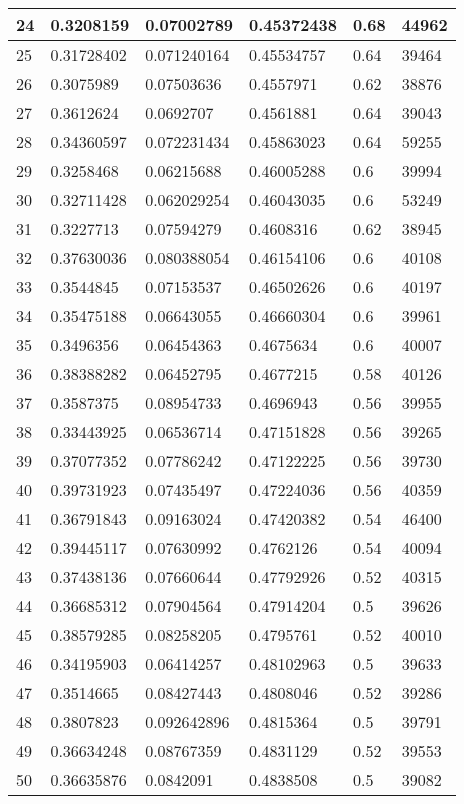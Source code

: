 \begin{longtable}{|l|l|l|l|l|l|}
24 & 0.3208159 & 0.07002789 & 0.45372438 & 0.68 & 44962 \\ \hline 
25 & 0.31728402 & 0.071240164 & 0.45534757 & 0.64 & 39464 \\ \hline 
26 & 0.3075989 & 0.07503636 & 0.4557971 & 0.62 & 38876 \\ \hline 
27 & 0.3612624 & 0.0692707 & 0.4561881 & 0.64 & 39043 \\ \hline 
28 & 0.34360597 & 0.072231434 & 0.45863023 & 0.64 & 59255 \\ \hline 
29 & 0.3258468 & 0.06215688 & 0.46005288 & 0.6 & 39994 \\ \hline 
30 & 0.32711428 & 0.062029254 & 0.46043035 & 0.6 & 53249 \\ \hline 
31 & 0.3227713 & 0.07594279 & 0.4608316 & 0.62 & 38945 \\ \hline 
32 & 0.37630036 & 0.080388054 & 0.46154106 & 0.6 & 40108 \\ \hline 
33 & 0.3544845 & 0.07153537 & 0.46502626 & 0.6 & 40197 \\ \hline 
34 & 0.35475188 & 0.06643055 & 0.46660304 & 0.6 & 39961 \\ \hline 
35 & 0.3496356 & 0.06454363 & 0.4675634 & 0.6 & 40007 \\ \hline 
36 & 0.38388282 & 0.06452795 & 0.4677215 & 0.58 & 40126 \\ \hline 
37 & 0.3587375 & 0.08954733 & 0.4696943 & 0.56 & 39955 \\ \hline 
38 & 0.33443925 & 0.06536714 & 0.47151828 & 0.56 & 39265 \\ \hline 
39 & 0.37077352 & 0.07786242 & 0.47122225 & 0.56 & 39730 \\ \hline 
40 & 0.39731923 & 0.07435497 & 0.47224036 & 0.56 & 40359 \\ \hline 
41 & 0.36791843 & 0.09163024 & 0.47420382 & 0.54 & 46400 \\ \hline 
42 & 0.39445117 & 0.07630992 & 0.4762126 & 0.54 & 40094 \\ \hline 
43 & 0.37438136 & 0.07660644 & 0.47792926 & 0.52 & 40315 \\ \hline 
44 & 0.36685312 & 0.07904564 & 0.47914204 & 0.5 & 39626 \\ \hline 
45 & 0.38579285 & 0.08258205 & 0.4795761 & 0.52 & 40010 \\ \hline 
46 & 0.34195903 & 0.06414257 & 0.48102963 & 0.5 & 39633 \\ \hline 
47 & 0.3514665 & 0.08427443 & 0.4808046 & 0.52 & 39286 \\ \hline 
48 & 0.3807823 & 0.092642896 & 0.4815364 & 0.5 & 39791 \\ \hline 
49 & 0.36634248 & 0.08767359 & 0.4831129 & 0.52 & 39553 \\ \hline 
50 & 0.36635876 & 0.0842091 & 0.4838508 & 0.5 & 39082 \\ \hline 
\end{longtable}